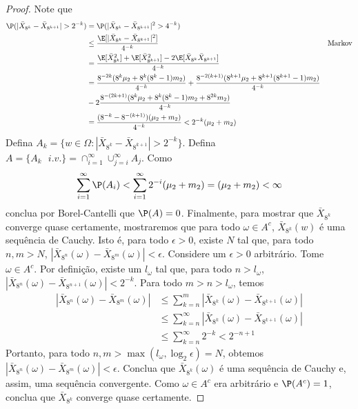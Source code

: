 \begin{proof}
 Note que 
 \begin{align*}
  \P(|\bar{X}_{8^{k}}-\bar{X}_{8^{k+1}}| > 2^{-k})
  &= \P(|\bar{X}_{8^{k}}-\bar{X}_{8^{k+1}}|^{2} 
  >4^{-k}) \\
  &\leq \frac{\E[|\bar{X}_{8^{k}}-\bar{X}_{8^{k+1}}|^{2}]}
  {4^{-k}}
  & \text{Markov} \\
  &=\frac{\E[\bar{X}_{8^{k}}^{2}]
  +\E[\bar{X}_{8^{k+1}}^{2}]
  -2\E[\bar{X}_{8^{k}}\bar{X}_{8^{k+1}}]}{4^{-k}} \\
  &= \frac{8^{-2k}(8^{k}\mu_{2}+8^{k}(8^{k}-1)m_{2})}
  {4^{-k}} +\frac{8^{-2(k+1)}(8^{k+1}\mu_{2}+8^{k+1}
  (8^{k+1}-1)m_{2})}{4^{-k}} \\
  & -2\frac{8^{-(2k+1)}(8^{k}\mu_{2}+8^{k}
  (8^{k}-1)m_{2}+8^{2k}m_{2})}{4^{-k}} \\
  &= \frac{(8^{-k}-8^{-(k+1)})(\mu_{2}+m_{2})}{4^{-k}}
  < 2^{-k}(\mu_{2}+m_{2})
 \end{align*}
 Defina $A_{k} =\{w \in \Omega: |\bar{X}_{8^{k}}-\bar{X}_{8^{k+1}}| > 2^{-k}\}$.
 Defina $A = \{A_{k} \text{ } i.v.\} = \cap_{i=1}^{\infty}\cup_{j=i}^{\infty}A_{j}$. 
 Como 
 \begin{align*}
  \sum_{i=1}^{\infty}{\P(A_{i})}
  < \sum_{i=1}^{\infty}{2^{-i}(\mu_{2}+m_{2})}
  = (\mu_{2}+m_{2}) < \infty
 \end{align*}
 conclua por Borel-Cantelli que $\P(A) = 0$.
 Finalmente, para mostrar que $
 \bar{X}_{8^{k}}$ converge quase certamente,
 mostraremos que para todo $\omega \in A^{c}$,
 $\bar{X}_{8^{k}}(w)$ é uma sequência de Cauchy.
 Isto é, para todo $\epsilon > 0$, existe 
 $N$ tal que, para todo $n,m > N$,
 $|\bar{X}_{8^{n}}(\omega)-\bar{X}_{8^{m}}(\omega)| < \epsilon$.
 Considere um $\epsilon > 0$ arbitrário.
 Tome $\omega \in A^{c}$. 
 Por definição, existe um $l_{\omega}$ tal que,
 para todo $n > l_{\omega}$,
 $|\bar{X}_{8^{n}}(\omega)-\bar{X}_{8^{n+1}}(\omega)| < 2^{-k}$.
 Para todo $m > n > l_{\omega}$, temos
 \begin{align*}
  |\bar{X}_{8^{n}}(\omega)-\bar{X}_{8^{m}}(\omega)|
  &\leq \sum_{k=n}^{m}{|\bar{X}_{8^{k}}(\omega)
  -\bar{X}_{8^{k+1}}(\omega)|} \\
  &\leq \sum_{k=n}^{\infty}{|\bar{X}_{8^{k}}(\omega)
  -\bar{X}_{8^{k+1}}(\omega)|} \\
  &\leq  \sum_{k=n}^{\infty}{2^{-k}} < 2^{-n+1}
 \end{align*}
 Portanto, para todo 
 $n,m > \max(l_{\omega},\log_{2}\epsilon) = N$, obtemos
 $|\bar{X}_{8^{n}}(\omega)-\bar{X}_{8^{m}}(\omega)| < \epsilon$.
 Conclua que $\bar{X}_{8^{k}}(\omega)$ é uma 
 sequência de Cauchy e, assim, uma 
 sequência convergente.
 Como $\omega \in A^{c}$ era arbitrário e 
 $\P(A^{c}) = 1$, conclua que 
 $\bar{X}_{8^{k}}$ converge quase certamente.
\end{proof}

